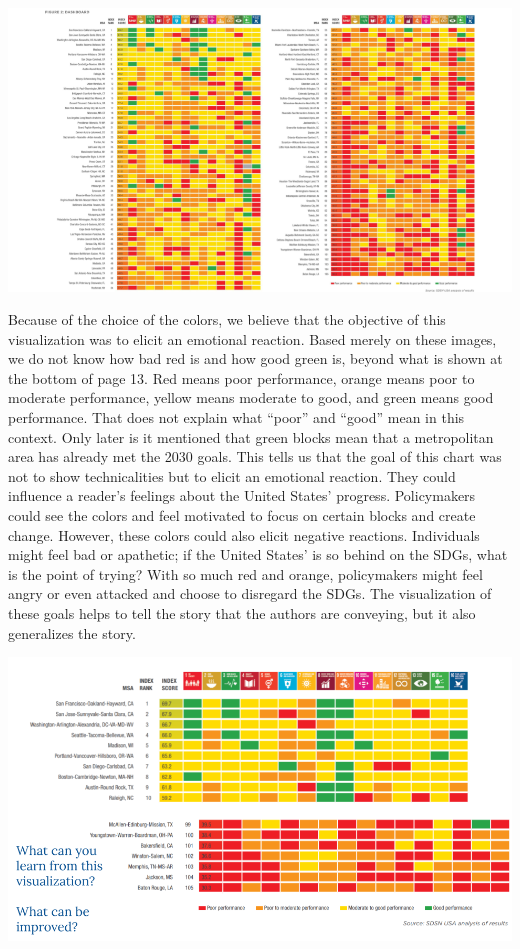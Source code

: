 \documentclass[]{article}
\begin{document}
\includegraphics[width=\textwidth,height=\textheight]{sdg_dashboard}

Because of the choice of the colors, we believe that the objective of
this visualization was to elicit an emotional reaction. Based merely on
these images, we do not know how bad red is and how good green is,
beyond what is shown at the bottom of page 13. Red means poor
performance, orange means poor to moderate performance, yellow means
moderate to good, and green means good performance. That does not
explain what ``poor'' and ``good'' mean in this context. Only later is
it mentioned that green blocks mean that a metropolitan area has already
met the 2030 goals. This tells us that the goal of this chart was not to
show technicalities but to elicit an emotional reaction. They could
influence a reader's feelings about the United States' progress.
Policymakers could see the colors and feel motivated to focus on certain
blocks and create change. However, these colors could also elicit
negative reactions. Individuals might feel bad or apathetic; if the
United States' is so behind on the SDGs, what is the point of trying?
With so much red and orange, policymakers might feel angry or even
attacked and choose to disregard the SDGs. The visualization of these
goals helps to tell the story that the authors are conveying, but it
also generalizes the story.

\includegraphics[width=\textwidth,height=\textheight]{chart_slice}
\end{document}
